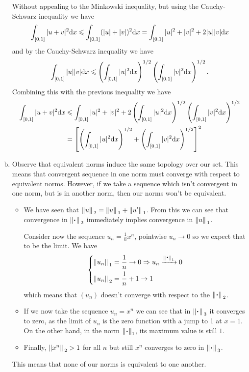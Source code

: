 \documentclass[12pt]{memoir}
\begin{document}
\begin{ptcbr}
\begin{enumerate}[(a)]
    Without appealing to the Minkowski inequality, but using the Cauchy-Schwarz inequality we have 
    $$\int_{\left\lbrack0,1\right\rbrack}|u+v|^2\dd x\leqslant \int_{\left\lbrack0,1\right\rbrack}(|u|+|v|)^2\dd x=\int_{\left\lbrack0,1\right\rbrack}|u|^2+|v|^2+2|u||v|\dd x$$
    and by the Cauchy-Schwarz inequality we have 
    $$\int_{\left\lbrack0,1\right\rbrack}|u||v|\dd x\leqslant\left(\int_{\left\lbrack0,1\right\rbrack}|u|^2\dd x\right)^{1/2}\left(\int_{\left\lbrack0,1\right\rbrack}|v|^2\dd x\right)^{1/2}.$$
    Combining this with the previous inequality we have
    \begin{align*}
    \int_{\left\lbrack0,1\right\rbrack}|u+v|^2\dd x&\leqslant \int_{\left\lbrack0,1\right\rbrack}|u|^2+|v|^2+2\left(\int_{\left\lbrack0,1\right\rbrack}|u|^2\dd x\right)^{1/2}\left(\int_{\left\lbrack0,1\right\rbrack}|v|^2\dd x\right)^{1/2}\\
    &=\left\lbrack\left(\int_{\left\lbrack0,1\right\rbrack}|u|^2\dd x\right)^{1/2}+\left(\int_{\left\lbrack0,1\right\rbrack}|v|^2\dd x\right)^{1/2}\right\rbrack^2
    \end{align*}%
    \item Observe that equivalent norms induce the same topology over our set. This means that convergent sequence in one norm must converge with respect to equivalent norms. However, if we take a sequence which isn't convergent in one norm, but is in another norm, then our norms won't be equivalent.
    \begin{itemize}
      \item We have seen that $\norm*{u}_2=\norm*{u}_1+\norm*{u'}_1$. From this we can see that convergence in $\norm*{\.}_2$ immediately implies convergence in $\norm*{u}_1$.\par 
      Consider now the sequence $u_n=\frac1nx^n$, pointwise $u_n\to 0$ so we expect that to be the limit. We have 
      $$\left\lbrace
      \begin{aligned}
        &\norm*{u_n}_1=\frac1n\to0\To u_n\xrightarrow{\norm*{\.}_1}0\\
        &\norm*{u_n}_2=\frac1n+1\to1
      \end{aligned}
      \right.$$ 
      which means that $(u_n)$ doesn't converge with respect to the $\norm*{\.}_2$.
      \item If we now take the sequence $u_n=x^n$ we can see that in $\norm*{\.}_3$ it converges to zero, as the limit of $u_n$ is the zero function with a jump to 1 at $x=1$. On the other hand, in the norm $\norm{\.}_1$, its maximum value is still $1$.
      \item Finally, $\norm*{x^n}_2>1$ for all $n$ but still $x^n$ converges to zero in $\norm*{\.}_3$. 
    \end{itemize}
    This means that none of our norms is equivalent to one another.
\end{enumerate}
\end{ptcbr}
\end{document}
